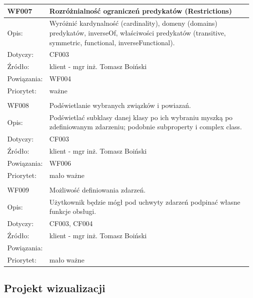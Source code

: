 \documentclass[a4paper,10pt]{article}
\begin{document}
\begin{center}
\begin{tabular}{|m{3cm}|m{9cm}|}
WF007 & Rozróżnialność ograniczeń predykatów (Restrictions) \\ \hline
Opis: & Wyróżnić kardynalność (cardinality), domeny (domains) predykatów, inverseOf, właściwości predykatów (transitive, symmetric, functional, inverseFunctional). \\ \hline
Dotyczy: &  CF003\\ \hline
Źródło: &  klient - mgr inż. Tomasz Boiński \\ \hline
Powiązania: & WF004\\ \hline
Priorytet: & ważne \\ \hline

\multicolumn{2}{c}{} \\
 \hline

WF008 &  Podświetlanie wybranych związków i powiazań.\\ \hline
Opis: &   Podświetlać subklasy danej klasy po ich wybraniu myszką po zdefiniowanym zdarzeniu; podobnie subproperty i complex class. \\ \hline
Dotyczy: &  CF003\\ \hline
Źródło: &  klient - mgr inż. Tomasz Boiński \\ \hline
Powiązania: & WF006\\ \hline
Priorytet: & mało ważne \\ \hline

\multicolumn{2}{c}{} \\
 \hline

WF009 & Możliwość definiowania zdarzeń. \\ \hline
Opis: &   Użytkownik będzie mógł pod uchwyty zdarzeń podpinać własne funkcje obsługi. \\ \hline
Dotyczy: & CF003, CF004  \\ \hline
Źródło: & klient - mgr inż. Tomasz Boiński \\ \hline
Powiązania: & \\ \hline
Priorytet: & mało ważne \\ \hline

\end{tabular}

\end{center}

\subsection{Projekt wizualizacji}
 
\end{document}
